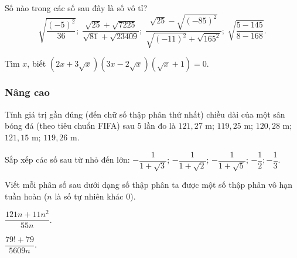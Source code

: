 \begin{bt}%
	Số nào trong các số sau đây là số vô tỉ?
	\[ \sqrt{\dfrac{\left(-5\right)^2}{36}} ;\; \dfrac{\sqrt{25}+\sqrt{7225}}{\sqrt{81}+\sqrt{23409}} ;\; \dfrac{\sqrt{25}-\sqrt{\left(-85\right)^2}}{\sqrt{\left(-11\right)^2}+\sqrt{165^2}} ;\; \sqrt{\dfrac{5-145}{8-168}}. \]
\end{bt}

\begin{bt}%
	Tìm $x$, biết $\left(2x+3\sqrt x\right)\left(3x-2\sqrt x\right)\left(\sqrt x+1\right)=0$.
\end{bt}
\subsubsection{Nâng cao}
\begin{bt}%
	Tính giá trị gần đúng (đến chữ số thập phân thứ nhất) chiều dài của một sân bóng đá (theo tiêu chuẩn FIFA) sau $5$ lần đo là $121{,}27$ m; $119{,}25$ m; $120{,}28$ m; $121{,}15$ m; $119{,}26$ m.
\end{bt}

\begin{bt}%
	Sắp xếp các số sau từ nhỏ đến lớn: $-\dfrac{1}{1+\sqrt 3}$; $-\dfrac{1}{1+\sqrt 2}$; $-\dfrac{1}{1+\sqrt 5}$; $-\dfrac{1}{2};-\dfrac{1}{3}$.
\end{bt}

\begin{bt}%
	Viết mỗi phân số sau dưới dạng số thập phân ta được một số thập phân vô hạn tuần hoàn ($n$ là số tự nhiên khác $0$).
	\begin{listEX}[2]
		\item $\dfrac{121n+11n^2}{55n}$.
		\item $\dfrac{79!+79}{5609n}$.
	\end{listEX}
\end{bt}

